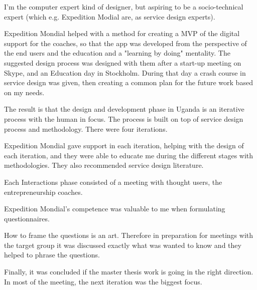 


I'm the computer expert kind of designer, but aspiring to be a socio-technical expert (which e.g. Expedition Modial are, as service design experts).

Expedition Mondial helped with a method for creating a MVP of the digital support for the coaches, so that the app was developed from the perspective of the end users and the education and a "learning by doing" mentality. The suggested design process was designed with them after a start-up meeting on Skype, and an Education day in Stockholm. During that day a crash course in service design was given, then creating a common plan for the future work based on my needs.

The result is that the design and development phase in Uganda is an iterative process with the human in focus. The process is built on top of service design process and methodology. There were four iterations.

Expedition Mondial gave support in each iteration, helping with the design of each iteration, and they were able to educate me during the different stages with methodologies. They also recommended service design literature.

Each Interactions phase consisted of a meeting with thought users, the entrepreneurship coaches.

Expedition Mondial's competence was valuable to me when formulating questionnaires.

How to frame the questions is an art.  Therefore in preparation for meetings with the target group it was discussed exactly what was wanted to know and they helped to phrase the questions.

Finally, it was concluded if the master thesis work is going in the right direction. In most of the meeting, the next iteration was the biggest focus. %


